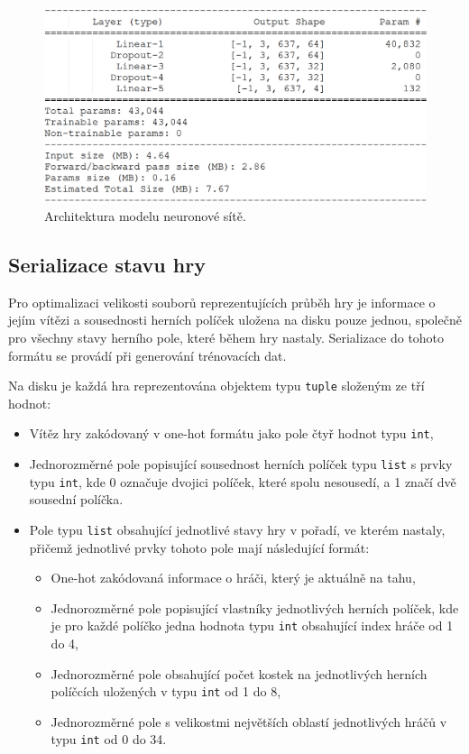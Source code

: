 \documentclass[a4paper,11pt]{article}
\begin{document}
		\begin{figure}[h]
			\label{fig:model}
			\centering
			\includegraphics[scale=0.5]{model.png}
			\caption{Architektura modelu neuronové sítě.}
		\end{figure}
	
	\subsection{Serializace stavu hry}
	\label{serialization}
		Pro optimalizaci velikosti souborů reprezentujících průběh hry je informace o jejím vítězi a sousednosti herních políček uložena na disku pouze jednou, společně pro všechny stavy herního pole, které během hry nastaly. Serializace do tohoto formátu se provádí při generování trénovacích dat.
		
		Na disku je každá hra reprezentována objektem typu \texttt{tuple} složeným ze tří hodnot:
	
		\begin{itemize}
			\item Vítěz hry zakódovaný v one-hot formátu jako pole čtyř hodnot typu \texttt{int},
			\item Jednorozměrné pole popisující sousednost herních políček typu \texttt{list} s prvky typu \texttt{int}, kde 0 označuje dvojici políček, které spolu nesousedí, a 1 značí dvě sousední políčka.
			\item Pole typu \texttt{list} obsahující jednotlivé stavy hry v pořadí, ve kterém nastaly, přičemž jednotlivé prvky tohoto pole mají následující formát:
			\begin{itemize}
				\item One-hot zakódovaná informace o hráči, který je aktuálně na tahu,
				\item Jednorozměrné pole popisující vlastníky jednotlivých herních políček, kde je pro každé políčko jedna hodnota typu \texttt{int} obsahující index hráče od 1 do 4,
				\item Jednorozměrné pole obsahující počet kostek na jednotlivých herních políčcích uložených v typu \texttt{int} od 1 do 8,
				\item Jednorozměrné pole s velikostmi největších oblastí jednotlivých hráčů v typu \texttt{int} od 0 do 34.
			\end{itemize}
		\end{itemize}
	
\end{document}
